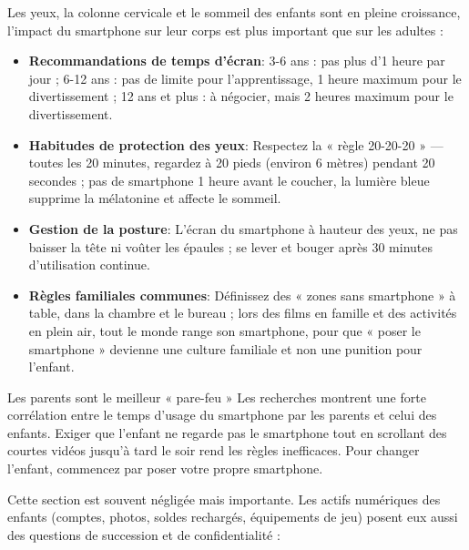 
Les yeux, la colonne cervicale et le sommeil des enfants sont en pleine croissance, l'impact du smartphone sur leur corps est plus important que sur les adultes :

\begin{itemize}
  \item \textbf{Recommandations de temps d'écran}: 3-6 ans : pas plus d'1 heure par jour ; 6-12 ans : pas de limite pour l'apprentissage, 1 heure maximum pour le divertissement ; 12 ans et plus : à négocier, mais 2 heures maximum pour le divertissement.
  \item \textbf{Habitudes de protection des yeux}: Respectez la « règle 20-20-20 » — toutes les 20 minutes, regardez à 20 pieds (environ 6 mètres) pendant 20 secondes ; pas de smartphone 1 heure avant le coucher, la lumière bleue supprime la mélatonine et affecte le sommeil.
  \item \textbf{Gestion de la posture}: L'écran du smartphone à hauteur des yeux, ne pas baisser la tête ni voûter les épaules ; se lever et bouger après 30 minutes d'utilisation continue.
  \item \textbf{Règles familiales communes}: Définissez des « zones sans smartphone » à table, dans la chambre et le bureau ; lors des films en famille et des activités en plein air, tout le monde range son smartphone, pour que « poser le smartphone » devienne une culture familiale et non une punition pour l'enfant.
\end{itemize}

\begin{tcbinfo}{Les parents sont le meilleur « pare-feu »}
Les recherches montrent une forte corrélation entre le temps d'usage du smartphone par les parents et celui des enfants. Exiger que l'enfant ne regarde pas le smartphone tout en scrollant des courtes vidéos jusqu'à tard le soir rend les règles inefficaces. Pour changer l'enfant, commencez par poser votre propre smartphone.

\end{tcbinfo}


Cette section est souvent négligée mais importante. Les actifs numériques des enfants (comptes, photos, soldes rechargés, équipements de jeu) posent eux aussi des questions de succession et de confidentialité :


